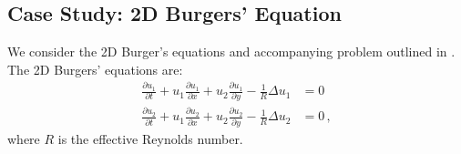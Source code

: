 \documentclass[Proposal.tex]{subfiles}
\begin{document}
\subsection{Case Study: 2D Burgers' Equation}
We consider the 2D Burger's equations and accompanying problem outlined in \cite{Burgers2D}.
The 2D Burgers' equations are:
\begin{equation}
	\begin{aligned}
		\frac{\partial u_1}{\partial t}+u_1\frac{\partial u_1}{\partial x}+u_2\frac{\partial u_1}{\partial y}-\frac{1}{R}\Delta u_1&=0\\
		\frac{\partial u_2}{\partial t}+u_1\frac{\partial u_2}{\partial x}+u_2\frac{\partial u_2}{\partial y}-\frac{1}{R}\Delta u_2&=0\,,
	\end{aligned}
\end{equation}
where $R$ is the effective Reynolds number.
\end{document}
